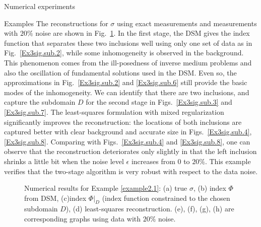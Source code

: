 \documentclass[11pt]{article}%
\renewcommand{\_}{{\fontfamily{ptm}\selectfont\textunderscore}}
\theoremstyle{plain}
\numberwithin{equation}{section}
\begin{document}
\begin{section}{Numerical experiments}
\begin{subsection}{Examples}
  The reconstructions for $\sigma$ using exact measurements and measurements with $20\%$ noise are shown in Fig.~\ref{Ex1.2_1.main}. In the first stage, the DSM gives the index function that separates these two inclusions well using only one set of data as in Fig.~\ref{Ex3sig.sub.2}, while some inhomogeneity is observed in the background. This phenomenon comes from the ill-posedness of inverse medium problems and also the oscillation of fundamental solutions used in the DSM. Even so, the approximations in Fig.~\ref{Ex3sig.sub.2} and \ref{Ex3sig.sub.6} still provide the basic modes of the inhomogeneity. We can identify that there are two inclusions, and capture the subdomain $D$ for the second stage in Figs.~\ref{Ex3sig.sub.3} and \ref{Ex3sig.sub.7}. The least-squares formulation with mixed regularization significantly improves the reconstruction: the locations of both inclusions are captured better with clear background and accurate size in Figs.~\ref{Ex3sig.sub.4}, \ref{Ex3sig.sub.8}. Comparing with Figs.~\ref{Ex3sig.sub.4} and \ref{Ex3sig.sub.8}, one can observe that the reconstruction deteriorates only slightly in that the left inclusion shrinks a little bit when the noise level $\epsilon$ increases from 0 to $20\%$. This example  verifies that the two-stage algorithm is very robust with respect to the data noise.




\begin{figure}[ht!]
\centering
{}
\caption{Numerical results for Example \ref{example2.1}: (a) true $\sigma$,  (b) index $\Phi$ from DSM, (c)index $\Phi|_D$ (index function constrained to the chosen subdomain $D$), (d) least-squares reconstruction. (e), (f), (g), (h) are corresponding graphs using data with $20\%$  noise. }
\label{Ex1.2_1.main}
\end{figure}





\end{subsection}
\end{section}
\end{document}
